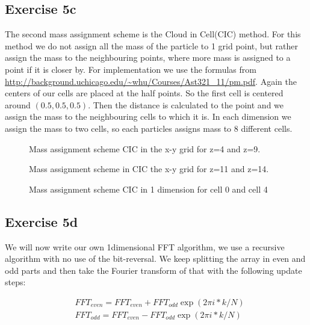 \subsection{Exercise 5c}
The second mass assignment scheme is the Cloud in Cell(CIC) method. For this method we do not assign all the mass of the particle to 1 grid point, but rather assign the mass to the neighbouring points, where more mass is assigned to a point if it is closer by. For implementation we use the formulas from \url{http://background.uchicago.edu/~whu/Courses/Ast321_11/pm.pdf}. Again the centers of our cells are placed at the half points. So the first cell is centered around $(0.5,0.5,0.5)$. Then the distance is calculated to the point and we assign the mass to the neighbouring cells to which it is. In each dimension we assign the mass to two cells, so each particles assigns mass to 8 different cells.

 \begin{figure}
    \centering
    \qquad
    \caption{Mass assignment scheme CIC in the x-y grid for z=4 and z=9.}

  \end{figure}
 \begin{figure}
    \centering
    \qquad
    \caption{Mass assignment scheme in CIC the x-y grid for z=11 and z=14.}
  \end{figure}

 \begin{figure}
    \centering
    \qquad
    \caption{Mass assignment scheme CIC in 1 dimension for cell 0 and cell 4}
  \end{figure}
  
\subsection{Exercise 5d}
We will now write our own 1dimensional FFT algorithm, we use a recursive algorithm with no use of the bit-reversal. We keep splitting the array in even and odd parts and then take the Fourier transform of that with the following update steps:

    
\begin{equation}
\begin{split}
&FFT_{even}=FFT_{even}+FFT_{odd}\exp(2\pi i*k/N) \\
&FFT_{odd}=FFT_{even}-FFT_{odd}\exp(2\pi i*k/N) 
\end{split}
\end{equation}

